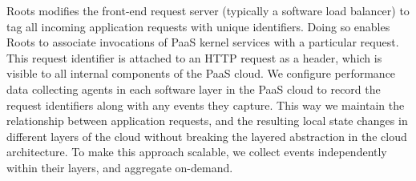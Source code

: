 

Roots modifies the front-end request server (typically a software load balancer) 
to tag all incoming application requests with unique identifiers. Doing so enables Roots
to associate invocations of PaaS kernel services with a particular request.
This request identifier is attached to an HTTP request as a header, which is visible to all 
internal components of the PaaS cloud. We configure performance data collecting
agents in each software layer in the PaaS 
cloud to record the request identifiers along with any events they capture. 
This way we maintain the relationship between application requests, and the resulting
local state changes in different layers of the cloud without breaking the
layered abstraction in the cloud architecture. 
To make this approach scalable, we collect events independently within their layers, and 
aggregate on-demand.

